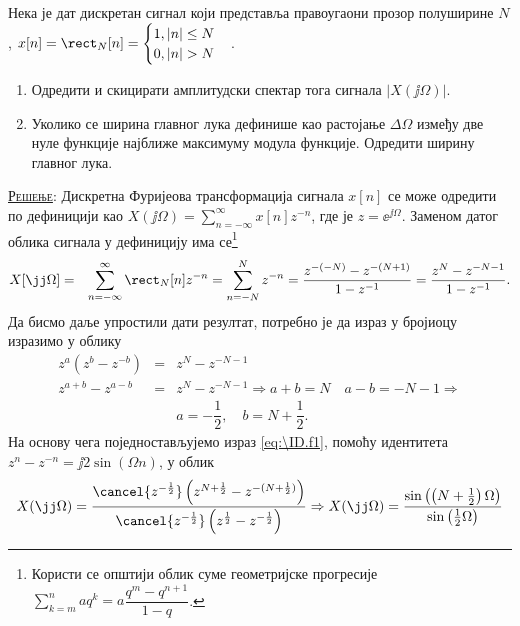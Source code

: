 \PID\mnImportant\label{z:dtft_rec}
Нека је дат дискретан сигнал који представља правоугаони прозор полуширине $N$,  
$x[n] = \rect_N[n] = \begin{cases}
    1, |n| \leq N \\
    0, |n| > N
\end{cases}$. 
\begin{enumerate}[label=(\alph*)]
    \item Одредити и скицирати амплитудски спектар тога сигнала $|X(\jj\Omega)|$.
    \item Уколико се ширина главног лука дефинише као растојање $\Delta \Omega$ између две нуле функције најближе 
    максимуму модула функције. Одредити ширину главног лука. 
\end{enumerate}

\textsc{\underline{Решење}:}
Дискретна Фуријеова трансформација сигнала $x[n]$ се може одредити по дефиницији као 
$X(\jj\Omega) = \sum_{n = -\infty}^{\infty} x[n] z^{-n}$, где је $z = \ee^{\jj\Omega}$. Заменом датог облика сигнала 
у дефиницију има се\footnote{Користи се општији облик суме геометријске прогресије
    $\sum_{k = m}^n a q^k = a\dfrac{q^m - q^{n+1}}{1-q}$.
}
\begin{eqnarray}
    X[\jj\Omega] &=& \sum_{n = -\infty}^{\infty} \rect_N[n] z^{-n} = \sum_{n = -N}^N z^{-n} 
    = \dfrac{ z^{-(-N)} - z^{-(N+1)} }{1 - z^{-1}} = 
    \dfrac{z^{N} - z^{-N-1}}{1 - z^{-1}}. \label{eq:\ID.f1}
\end{eqnarray}
Да бисмо даље упростили дати резултат, потребно је да израз у бројиоцу изразимо у облику
\begin{eqnarray}
    z^a(z^b - z^{-b}) &=& z^{N} - z^{-N-1}  \\[2mm]
    z^{a+b} - z^{a-b} &=& z^{N} - z^{-N-1} \Rightarrow
    a+b = N\quad a-b = -N-1  
    \Rightarrow \\
    && a = -\dfrac{1}{2}, \quad b = N + \dfrac{1}{2}.
\end{eqnarray}
На основу чега поједностављујемо израз \ref{eq:\ID.f1}, помоћу идентитета 
$z^n - z^{-n} = \jj 2 \sin(\Omega n)$, у облик 
\begin{equation}
    X(\jj\Omega) = \dfrac{ \cancel{z^{-\frac12}}\left( z^{N + \frac12} - z^{-(N + \frac12)} \right)  }
    { \cancel{z^{-\frac12}} \left( z^{\frac {1}2} - z^{-\frac {1}2} \right)}
    \Rightarrow
    X(\jj\Omega) 
    = \dfrac{\sin \left( \left(N + \frac12\right) \Omega \right) }{ \sin \left(  \frac12 \Omega \right)}
    \label{\ID:eq_rez}
\end{equation}

